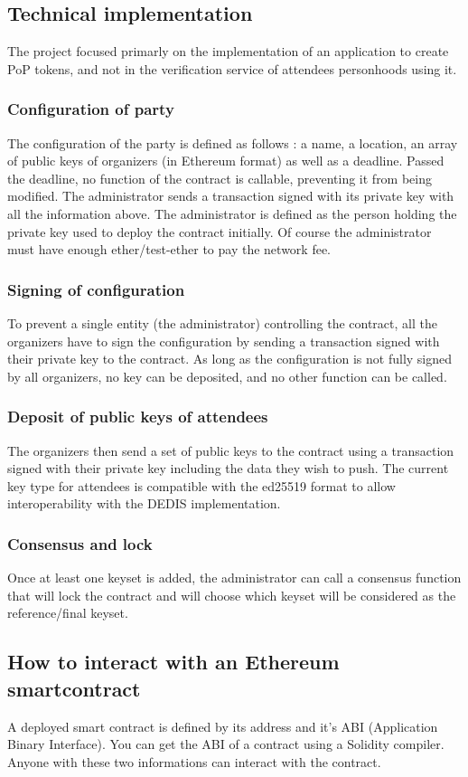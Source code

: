 \documentclass[11pt, a4paper, twoside, openright]{article} %
\begin{document}
\subsection{Technical implementation}
The project focused primarly on the implementation of an application to create PoP tokens, and not in the verification service of attendees personhoods using it.
\subsubsection{Configuration of party}
The configuration of the party is defined as follows : a name, a location, an array of public keys of organizers (in Ethereum format) as well as a deadline. Passed the deadline, no function of the contract is callable, preventing it from being modified. The administrator sends a transaction signed with its private key with all the information above. The administrator is defined as the person holding the private key used to deploy the contract initially. Of course the administrator must have enough ether/test-ether to pay the network fee.
\subsubsection{Signing of configuration}
To prevent a single entity (the administrator) controlling the contract, all the organizers have to sign the configuration by sending a transaction signed with their private key to the contract. As long as the configuration is not fully signed by all organizers, no key can be deposited, and no other function can be called.
\subsubsection{Deposit of public keys of attendees}
The organizers then send a set of public keys to the contract using a transaction signed with their private key including the data they wish to push. The current key type for attendees is compatible with the ed25519 format to allow interoperability with the DEDIS implementation.
\subsubsection{Consensus and lock}
Once at least one keyset is added, the administrator can call a consensus function that will lock the contract and will choose which keyset will be considered as the reference/final keyset.


\subsection{How to interact with an Ethereum smartcontract}
A deployed smart contract is defined by its address and it's ABI (Application Binary Interface). You can get the ABI of a contract using a Solidity compiler. Anyone with these two informations can interact with the contract.
\end{document}

